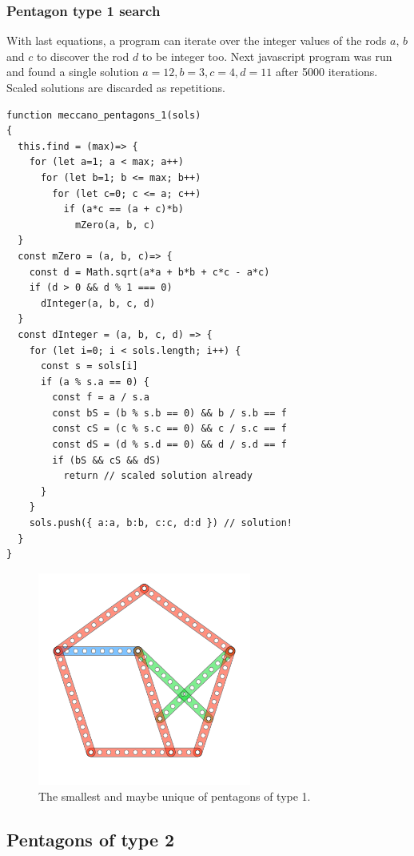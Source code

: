 \documentclass[11pt]{article}
\begin{document}
\subsubsection{Pentagon type 1 search}

With last equations, a program can iterate over the integer values of the rods $a$, $b$ and $c$ to discover the rod $d$ to be integer too. Next javascript program was run and found a single solution $a = 12, b = 3, c = 4, d = 11$ after 5000 iterations. Scaled solutions are discarded as repetitions.

\begin{lstlisting}
function meccano_pentagons_1(sols)
{
  this.find = (max)=> {
    for (let a=1; a < max; a++)
      for (let b=1; b <= max; b++)
        for (let c=0; c <= a; c++)
          if (a*c == (a + c)*b)
            mZero(a, b, c)
  }
  const mZero = (a, b, c)=> {
    const d = Math.sqrt(a*a + b*b + c*c - a*c)
    if (d > 0 && d % 1 === 0)
      dInteger(a, b, c, d)
  }
  const dInteger = (a, b, c, d) => {
    for (let i=0; i < sols.length; i++) {
      const s = sols[i]
      if (a % s.a == 0) {
        const f = a / s.a
        const bS = (b % s.b == 0) && b / s.b == f
        const cS = (c % s.c == 0) && c / s.c == f
        const dS = (d % s.d == 0) && d / s.d == f
        if (bS && cS && dS)
          return // scaled solution already
      }
    }
    sols.push({ a:a, b:b, c:c, d:d }) // solution!
  }
}

\end{lstlisting}

\begin{figure}
\centering
\includegraphics[width=7cm]{pentagon-12a}
\caption{The smallest and maybe unique of pentagons of type 1.}
\label{pentagon-12a}
\end{figure}


\subsection{Pentagons of type 2}
\end{document}
